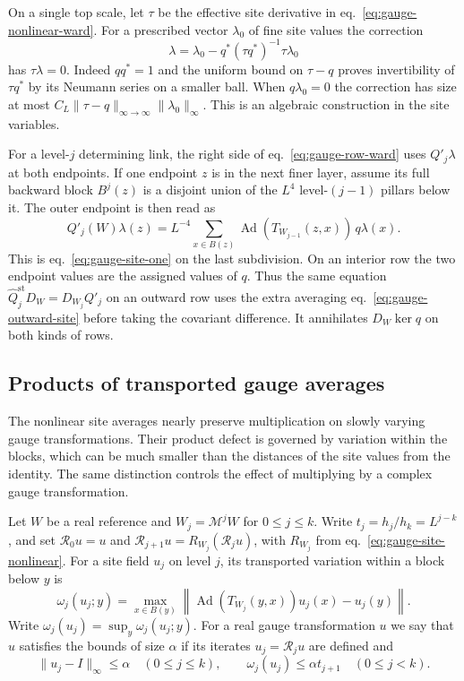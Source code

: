 \documentclass[11pt,letterpaper,reqno]{amsart}
\numberwithin{equation}{section}
\renewcommand{\eqref}[1]{\textup{eq.~\ref{#1}}}
\theoremstyle{definition}
\theoremstyle{remark}
\begin{document}
On a single top scale, let \(\tau\) be the effective site derivative
in \eqref{eq:gauge-nonlinear-ward}. For a prescribed vector
\(\lambda_0\) of fine site values the correction
\begin{equation}\label{eq:gauge-effective-kernel}
 \lambda=\lambda_0-q^\ast(\tau q^\ast)^{-1}\tau\lambda_0
\end{equation}
has \(\tau\lambda=0\). Indeed \(qq^\ast=1\) and the uniform
bound on \(\tau-q\) proves invertibility of \(\tau q^\ast\)
by its Neumann series on a smaller ball. When \(q\lambda_0=0\)
the correction has size at most
\(C_L\|\tau-q\|_{\infty\to\infty}\|\lambda_0\|_\infty\).
This is an algebraic construction in the site variables.

For a level-\(j\) determining link, the right side of
\eqref{eq:gauge-row-ward} uses \(Q'_j\lambda\) at both endpoints.
If one endpoint \(z\) is in the next finer layer, assume its full
backward block \(B^j(z)\) is a disjoint union of the \(L^4\)
level-\((j-1)\) pillars below it. The outer endpoint is then read as
\begin{equation}\label{eq:gauge-outward-site}
 Q'_j(W)\lambda(z)=L^{-4}\sum_{x\in B(z)}
   \operatorname{Ad}(T_{W_{j-1}}(z,x))\,q\lambda(x).
\end{equation}
This is \eqref{eq:gauge-site-one} on the last subdivision.
On an interior row the two endpoint values are the assigned values
of \(q\). Thus the same equation \(\widehat Q^{\mathrm{st}}_jD_W=
D_{W_j}Q'_j\) on an outward row uses the extra averaging
\eqref{eq:gauge-outward-site} before taking the covariant difference.
It annihilates \(D_W\ker q\) on both kinds of rows.

\subsection{Products of transported gauge averages}
\label{sec:gauge-products}

The nonlinear site averages nearly preserve multiplication on slowly
varying gauge transformations. Their product defect is governed by
variation within the blocks, which can be much smaller than the
distances of the site values from the identity. The same distinction
controls the effect of multiplying by a complex gauge transformation.

Let \(W\) be a real reference and \(W_j=\mathcal M^j W\) for
\(0\leq j\leq k\). Write \(t_j=h_j/h_k=L^{j-k}\), and set
\(\mathcal R_0 u=u\) and
\(\mathcal R_{j+1}u=R_{W_j}(\mathcal R_j u)\), with \(R_{W_j}\)
from \eqref{eq:gauge-site-nonlinear}. For a site field \(u_j\) on
level \(j\), its transported variation within a block below \(y\)
is
\[
 \omega_j(u_j;y)=
 \max_{x\in B(y)}
  \left\|\operatorname{Ad}(T_{W_j}(y,x))u_j(x)-u_j(y)\right\|.
\]
Write \(\omega_j(u_j)=\sup_y\omega_j(u_j;y)\).
For a real gauge transformation \(u\) we say that \(u\) satisfies
the bounds of size \(\alpha\) if its iterates \(u_j=\mathcal R_j u\)
are defined and
\begin{equation}\label{eq:gauge-product-class}
 \|u_j-I\|_\infty\leq\alpha\quad (0\leq j\leq k),
 \qquad \omega_j(u_j)\leq\alpha t_{j+1}\quad (0\leq j<k).
\end{equation}
\end{document}
